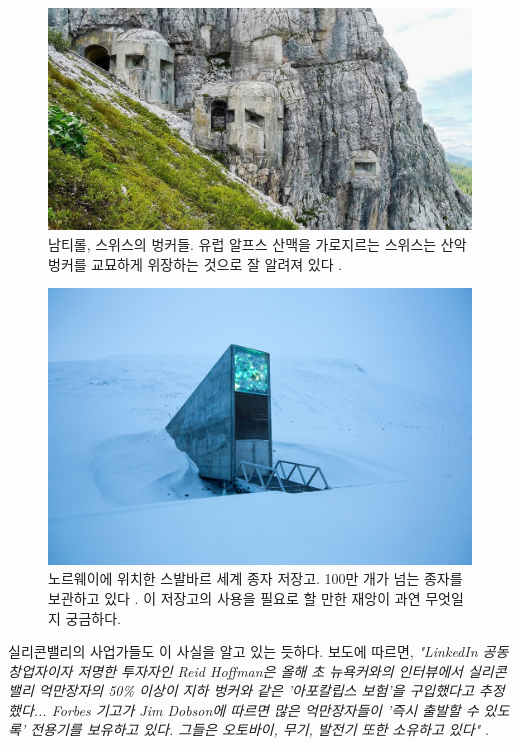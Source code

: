 \documentclass[10pt,twocolumn,letterpaper]{article}
\begin{document}
\begin{figure}[t]
\begin{center}
   \includegraphics[width=1\linewidth]{tyrol.jpg}
\end{center}
   \caption{남티롤, 스위스의 벙커들. 유럽 알프스 산맥을 가로지르는 스위스는 산악 벙커를 교묘하게 위장하는 것으로 잘 알려져 있다 \cite{32}.}
\label{fig:7}
\label{fig:onecol}
\end{figure}

\begin{figure}[t]
\begin{center}
   \includegraphics[width=1\linewidth]{svalbard.jpg}
\end{center}
   \caption{노르웨이에 위치한 스발바르 세계 종자 저장고. 100만 개가 넘는 종자를 보관하고 있다 \cite{24}. 이 저장고의 사용을 필요로 할 만한 재앙이 과연 무엇일지 궁금하다.}
\label{fig:8}
\label{fig:onecol}
\end{figure}

실리콘밸리의 사업가들도 이 사실을 알고 있는 듯하다. 보도에 따르면, \textit{"LinkedIn 공동 창업자이자 저명한 투자자인 Reid Hoffman은 올해 초 뉴욕커와의 인터뷰에서 실리콘밸리 억만장자의 50\% 이상이 지하 벙커와 같은 '아포칼립스 보험'을 구입했다고 추정했다... Forbes 기고가 Jim Dobson에 따르면 많은 억만장자들이 '즉시 출발할 수 있도록' 전용기를 보유하고 있다. 그들은 오토바이, 무기, 발전기 또한 소유하고 있다"} \cite{28}.
\end{document}
